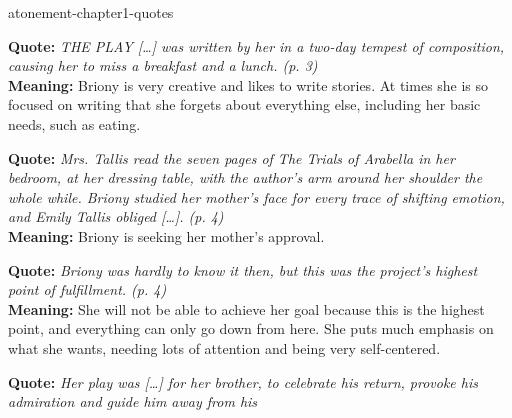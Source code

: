 \documentclass[preview]{standalone}
\begin{document}
\begin{snippet}{atonement-chapter1-quotes}
\begin{minipage}[l]{0.05\textwidth}
\end{minipage}
\begin{minipage}[r]{0.95\textwidth}
    \textbf{Quote:} \textit{
        THE PLAY […] was written by her in a two-day tempest of
        composition, causing her to miss a breakfast and a lunch.
        (p. 3)
    }
    \\
    \textbf{Meaning:}
    Briony is very creative and likes to write stories.
    At times she is so focused on writing that she
    forgets about everything else, including her
    basic needs, such as eating.
\end{minipage}
\hr
\begin{minipage}[l]{0.05\textwidth}
\end{minipage}
\begin{minipage}[r]{0.95\textwidth}
    \textbf{Quote:} \textit{
        Mrs. Tallis read the seven pages of The Trials of Arabella
        in her bedroom, at her dressing table, with the author's
        arm around her shoulder the whole while. Briony studied
        her mother's face for every trace of shifting emotion, and
        Emily Tallis obliged […]. (p. 4)
    }
    \\
    \textbf{Meaning:} Briony is seeking her mother's approval.
\end{minipage}
\hr
\begin{minipage}[l]{0.05\textwidth}
\end{minipage}
\begin{minipage}[r]{0.95\textwidth}
    \textbf{Quote:} \textit{
        Briony was hardly to know it then, but this was the
        project's highest point of fulfillment. (p. 4)
    }
    \\
    \textbf{Meaning:} She will not be able to achieve her goal because this is the highest point,
    and everything can only go down from here. She puts much emphasis on what she wants,
    needing lots of attention and being very self-centered.
\end{minipage}
\hr
\begin{minipage}[l]{0.05\textwidth}
\end{minipage}
\begin{minipage}[r]{0.95\textwidth}
    \textbf{Quote:} \textit{
        Her play was […] for her brother, to celebrate his return,
        provoke his admiration and guide him away from his
}
\end{minipage}
\end{snippet}
\end{document}
